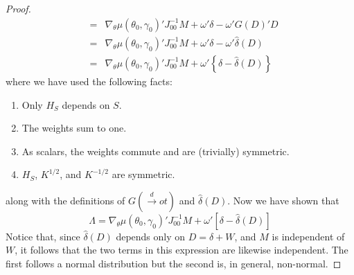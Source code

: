 \begin{proof}
\begin{eqnarray*}
			&=&\nabla_{\theta}\mu(\theta_0, \gamma_0)'J_{00}^{-1}M+  \omega'\delta - \omega 'G(D)'D \\
			&=&\nabla_{\theta}\mu(\theta_0, \gamma_0)'J_{00}^{-1}M+  \omega'\delta - \omega' \hat{\delta}(D)\\
			&=&\nabla_{\theta}\mu(\theta_0, \gamma_0)'J_{00}^{-1}M+  \omega'\left\{\delta - \hat{\delta}(D)\right\}
\end{eqnarray*}
where we have used the following facts:
	\begin{enumerate}
		\item Only $H_S$ depends on $S$.
		\item The weights sum to one.
		\item As scalars, the weights commute and are (trivially) symmetric.
		\item $H_S$, $K^{1/2}$, and $K^{-1/2}$ are symmetric.
	\end{enumerate}
along with the definitions of $G(\overset{d}{\rightarrow}ot)$ and $\hat{\delta}(D)$. Now we have shown that
	$$
\Lambda = \nabla_\theta \mu(\theta_0,\gamma_0)' J_{00}^{-1} M + \omega' \left[\delta - \hat{\delta}(D) \right] 
$$
Notice that, since $\hat{\delta}(D)$ depends only on $D = \delta + W$, and $M$ is independent of $W$, it follows that the two terms in this expression are likewise independent. The first follows a normal distribution but the second is, in general, non-normal.


\end{proof}
